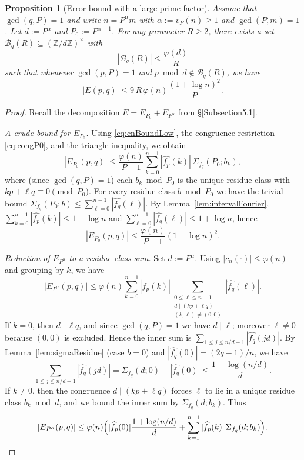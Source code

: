 \documentclass[12pt]{amsart}
\newtheorem{proposition}[theorem]{Proposition}
\begin{document}
\begin{proposition}[Error bound with a large prime factor]\label{prop:errorBound}
Assume that $\gcd(q,P)=1$ and write $n=P^{\alpha}m$ with $\alpha:=v_P(n)\ge 1$ and $\gcd(P,m)=1$.
Let $d:=P^{\alpha}$ and $P_0:=P^{\alpha-1}$.
For any parameter $R\ge 2$, there exists a set $\mathcal B_q(R)\subseteq (\mathbb Z/d\mathbb Z)^\times$
with
\[
|\mathcal B_q(R)|\le \frac{\varphi(d)}{R}
\]
such that whenever $\gcd(p,P)=1$ and $p \bmod d \notin \mathcal B_q(R)$, we have
\[
|E(p,q)| \le 9\,R\,\varphi(n)\frac{(1+\log n)^2}{P}.
\]
\end{proposition}

\begin{proof}
Recall the decomposition $E=E_{P_0}+E_{P^{\alpha}}$ from \S\ref{Subsection5.1}.

\smallskip
\noindent\emph{A crude bound for $E_{P_0}$.}
Using \eqref{eq:cnBoundLow}, the congruence restriction \eqref{eq:congP0}, and the triangle inequality, we obtain
\[
|E_{P_0}(p,q)|
\le \frac{\varphi(n)}{P-1}\sum_{k=0}^{n-1}|\widehat{f_p}(k)|\,
\Sigma_{f_q}(P_0;b_k),
\]
where (since $\gcd(q,P)=1$) each $b_k\bmod P_0$ is the unique residue class with $kp+\ell q\equiv 0\pmod{P_0}$.
For every residue class $b\bmod P_0$ we have the trivial bound
$\Sigma_{f_q}(P_0;b)\le \sum_{\ell=0}^{n-1}|\widehat{f_q}(\ell)|$.
By Lemma~\ref{lem:intervalFourier}, $\sum_{k=0}^{n-1}|\widehat{f_p}(k)|\le 1+\log n$ and
$\sum_{\ell=0}^{n-1}|\widehat{f_q}(\ell)|\le 1+\log n$, hence
\begin{equation}\label{eq:EP0crude}
|E_{P_0}(p,q)|\le \frac{\varphi(n)}{P-1}(1+\log n)^2.
\end{equation}

\smallskip
\noindent\emph{Reduction of $E_{P^\alpha}$ to a residue-class sum.}
Set $d:=P^\alpha$. Using $|c_n(\cdot)|\le \varphi(n)$ and grouping by $k$, we have
\[
|E_{P^\alpha}(p,q)|
\le \varphi(n)\sum_{k=0}^{n-1}|\widehat{f_p}(k)|
\sum_{\substack{0\le \ell\le n-1\\ d\mid(kp+\ell q)\\ (k,\ell)\neq (0,0)}}|\widehat{f_q}(\ell)|.
\]
If $k=0$, then $d\mid \ell q$, and since $\gcd(q,P)=1$ we have $d\mid \ell$; moreover $\ell\neq 0$ because $(0,0)$
is excluded. Hence the inner sum is $\sum_{1\le j\le n/d-1}|\widehat{f_q}(jd)|$.
By Lemma~\ref{lem:sigmaResidue} (case $b=0$) and $|\widehat{f_q}(0)|=(2q-1)/n$, we have
\begin{equation}\label{eq:multdTail_q}
\sum_{1\le j\le n/d-1}|\widehat{f_q}(jd)|
=\Sigma_{f_q}(d;0)-|\widehat{f_q}(0)|
\le \frac{1+\log(n/d)}{d}.
\end{equation}
If $k\neq 0$, then the congruence $d\mid(kp+\ell q)$ forces $\ell$ to lie in a unique residue class
$b_k\bmod d$, and we bound the inner sum by $\Sigma_{f_q}(d;b_k)$. Thus
\begin{equation}\label{eq:EPalpha_basic}
|E_{P^\alpha}(p,q)|
\le \varphi(n)\Bigl(|\widehat{f_p}(0)|\frac{1+\log(n/d)}{d}
+\sum_{k=1}^{n-1}|\widehat{f_p}(k)|\,\Sigma_{f_q}(d;b_k)\Bigr).
\end{equation}


\end{proof}
\end{document}
